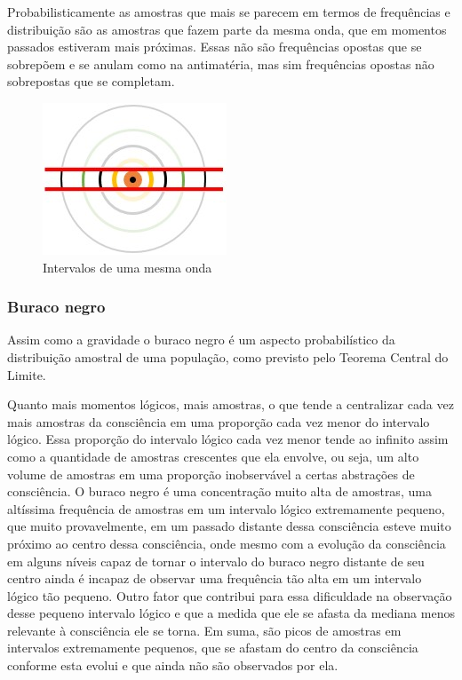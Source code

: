 Probabilisticamente as amostras que mais se parecem em termos de frequências e distribuição são as amostras que fazem parte da mesma onda, que em momentos passados estiveram mais próximas. Essas não são frequências opostas que se sobrepõem e se anulam como na antimatéria, mas sim frequências opostas não sobrepostas que se completam.

\begin{figure}[H]
\caption{Intervalos de uma mesma onda}
\label{fig:consciousness_coexistence_waves}
\centering
\includegraphics[scale=1]{sections/images/consciousness_coexistence_waves.jpg}
\end{figure}

\subsubsection{Buraco negro}
Assim como a gravidade o buraco negro é um aspecto probabilístico da distribuição amostral de uma população, como previsto pelo Teorema Central do Limite. 

Quanto mais momentos lógicos, mais amostras, o que tende a centralizar cada vez mais amostras da consciência em uma proporção cada vez menor do intervalo lógico. Essa proporção do intervalo lógico cada vez menor tende ao infinito assim como a quantidade de amostras crescentes que ela envolve, ou seja, um alto volume de amostras em uma proporção inobservável a certas abstrações de consciência. O buraco negro é uma concentração muito alta de amostras, uma altíssima frequência de amostras em um intervalo lógico extremamente pequeno, que muito provavelmente, em um passado distante dessa consciência esteve muito próximo ao centro dessa consciência, onde mesmo com a evolução da consciência em alguns níveis capaz de tornar o intervalo do buraco negro distante de seu centro ainda é incapaz de observar uma frequência tão alta em um intervalo lógico tão pequeno. Outro fator que contribui para essa dificuldade na observação desse pequeno intervalo lógico e que a medida que ele se afasta da mediana menos relevante à consciência ele se torna. Em suma, são picos de amostras em intervalos extremamente pequenos, que se afastam do centro da consciência conforme esta evolui e que ainda não são observados por ela.

